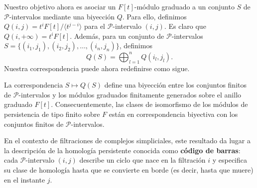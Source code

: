 Nuestro objetivo ahora es asociar un \( F[t] \)-módulo graduado a un conjunto \( S \) de $\mathcal{P}$-intervalos mediante una biyección \( Q \). Para ello, definimos \( Q(i, j) = t^i F[t]/\langle t^{j-i}\rangle \) para el $\mathcal{P}$-intervalo \( (i, j) \). Es claro que \( Q(i, +\infty) = t^i F[t] \). Además, para un conjunto de $\mathcal{P}$-intervalos \( S = \{(i_1, j_1), (i_2, j_2), \ldots, (i_n, j_n)\} \), definimos
\[
Q(S) = \bigoplus_{l=1}^n Q(i_l, j_l).
\]
Nuestra correspondencia puede ahora redefinirse como sigue.

\begin{corolario}
La correspondencia \( S \mapsto Q(S) \) define una biyección entre los conjuntos finitos de $\mathcal{P}$-intervalos y los módulos graduados finitamente generados sobre el anillo graduado \( F[t] \). Consecuentemente, las clases de isomorfismo de los módulos de persistencia de tipo finito sobre \( F \) están en correspondencia biyectiva con los conjuntos finitos de $\mathcal{P}$-intervalos.
\end{corolario}

En el contexto de filtraciones de complejos simpliciales, este resultado da lugar a la descripción de la homología persistente conocida como \textbf{código de barras}: cada $\mathcal{P}$-intervalo $(i, j)$ describe un ciclo que nace en la filtración $i$ y especifica su clase de homología hasta que se convierte en borde (es decir, hasta que muere) en el instante $j$.%

